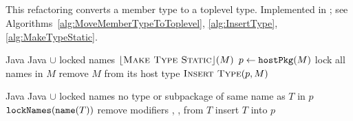 \subsection{}
This refactoring converts a member type to a toplevel type. Implemented in ; see Algorithms~\ref{alg:MoveMemberTypeToToplevel}, \ref{alg:InsertType}, \ref{alg:MakeTypeStatic}.

\begin{algorithm}
\caption{$\refactoring{Move Member Type to Toplevel}(M : \type{MemberType})$}
\label{alg:MoveMemberTypeToToplevel}
\begin{algorithmic}[1]
\REQUIRE Java
\ENSURE Java $\cup$ locked names
\medskip
{}
  \STATE $\lfloor\textsc{Make Type Static}\rfloor(M)$
\ENDIF
\STATE $p \leftarrow \text{\texttt{hostPkg}}(M)$
\STATE lock all names in $M$
\STATE remove $M$ from its host type
\STATE $\textsc{Insert Type}(p, M)$
\end{algorithmic}
\end{algorithm}

\begin{algorithm}
\caption{$\refactoring{Insert Type}(p : \type{Package}, T : \type{ClassOrInterface})$}
\label{alg:InsertType}
\begin{algorithmic}[1]
\REQUIRE Java
\ENSURE Java $\cup$ locked names
\medskip
\STATE \assert no type or subpackage of same name as $T$ in $p$
\STATE $\text{\texttt{lockNames}}(\text{\texttt{name}}(T))$
\STATE remove modifiers , ,  from $T$
\STATE insert $T$ into $p$
\end{algorithmic}
\end{algorithm}

